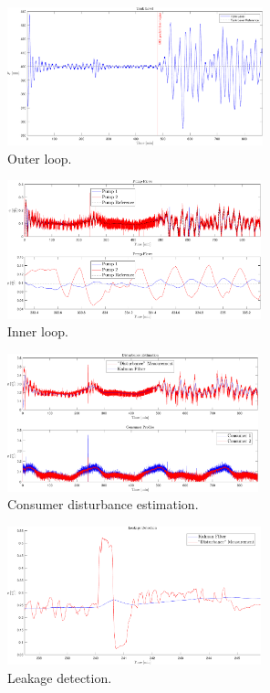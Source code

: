 \begin{figure}[h!]
	\includegraphics[height=4cm, width=\linewidth]{Graphics/OuterLoop.pdf}
	\caption{Outer loop.}
	\label{fig:OuterLoop}
\end{figure}


\begin{figure}[h!]
	\includegraphics[width=\linewidth,height=4cm]{Graphics/InnerLoop.pdf}
	\caption{Inner loop.}
	\label{fig:InnerLoop}
\end{figure}


\begin{figure}[h!]
	\includegraphics[height=4cm, width=\linewidth]{Graphics/DisturbanceEstimation.pdf}
	\caption{Consumer disturbance estimation.}
	\label{fig:DisturbanceEstimation}
\end{figure}

\begin{figure}[h!]
	\includegraphics[height=4cm, width=\linewidth]{Graphics/LeakageDetection.pdf}
	\caption{Leakage detection.}
	\label{fig:Leakage}
\end{figure}



